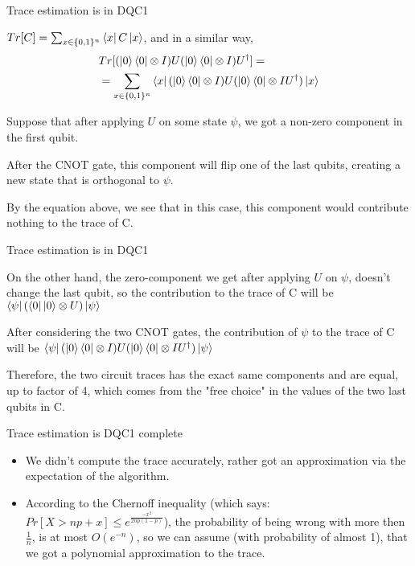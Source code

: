 \documentclass[leqno,fleqn]{beamer}
\begin{document}
\begin{frame}[label=sec-2-4]{Trace estimation is in DQC1}
\begin{block}{}
\(Tr[C] = \sum_{x \in \{0,1\}^n} \left\langle{x}\right\vert C\left\vert{x}\right\rangle\), and in a similar way,
\begin{align*}
&Tr[(\left\vert{0}\right\rangle\left\langle{0}\right\vert \otimes I)U(\left\vert{0}\right\rangle\left\langle{0}\right\vert \otimes I)U^\dagger] = \\
&= \sum_{x \in \{0,1\}^n} \left\langle{x}\right\vert(\left\vert{0}\right\rangle\left\langle{0}\right\vert\otimes I)U(\left\vert{0}\right\rangle\left\langle{0}\right\vert\otimes I{U^\dagger})\left\vert{x}\right\rangle
\end{align*}
\end{block}
\begin{block}{}
Suppose that after applying \(U\) on some state \(\psi\), we got a non-zero component in the first qubit.
\end{block}
\begin{block}{}
After the CNOT gate, this component will flip one of the last qubits, creating a new state that is orthogonal to \(\psi\).
\end{block}
\begin{block}{}
By the equation above, we see that in this case, this component would contribute nothing to the trace of C.
\end{block}
\end{frame}
\begin{frame}[label=sec-2-5]{Trace estimation is in DQC1}
\begin{block}{}
On the other hand, the zero-component we get after applying \(U\) on \(\psi\), doesn't change the last qubit, so the contribution to the trace of C will be \(\left\langle{\psi}\right\vert(\left\langle{0}\right\vert\left\vert{0}\right\rangle \otimes U)\left\vert{\psi}\right\rangle\)
\end{block}
\begin{block}{}
After considering the two CNOT gates, the contribution of \(\psi\) to the trace of C will be \(\left\langle{\psi}\right\vert(\left\vert{0}\right\rangle\left\langle{0}\right\vert\otimes I)U(\left\vert{0}\right\rangle\left\langle{0}\right\vert\otimes I{U^\dagger})\left\vert{\psi}\right\rangle\)
\end{block}
\begin{block}{}
Therefore, the two circuit traces has the exact same components and are equal, up to factor of 4, which comes from the "free choice" in the values of the two last qubits in C.
\end{block}
\end{frame}
\begin{frame}[label=sec-2-6]{Trace estimation is DQC1 complete}
\begin{itemize}
\item We didn't compute the trace accurately, rather got an approximation via the expectation of the algorithm.
\item According to the Chernoff inequality (which says: \(Pr[X > np +x] \leq e^{\frac{-x^{2}}{2np(1-p)}}\)), the probability of being wrong with more then \(\frac{1}{n}\), is at most \(O(e^{-n})\), so we can assume (with probability of almost 1), that we got a polynomial approximation to the trace.
\end{itemize}
\end{frame}
\end{document}
